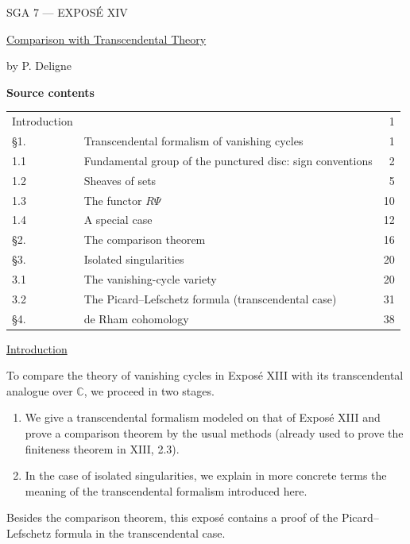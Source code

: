 \clearpage
\begin{center}
{\large SGA 7 --- EXPOS\'E XIV}\par
\vspace{2em}
{\Large\underline{Comparison with Transcendental Theory}}\par
\vspace{1.5em}
{\large by P. Deligne}
\end{center}

\medskip
\noindent\textbf{Source contents}
\begin{center}
\begin{tabular}{@{}llr@{}}
Introduction && 1\\
\S1. & Transcendental formalism of vanishing cycles & 1\\
1.1 & Fundamental group of the punctured disc: sign conventions & 2\\
1.2 & Sheaves of sets & 5\\
1.3 & The functor $R\Psi$ & 10\\
1.4 & A special case & 12\\
\S2. & The comparison theorem & 16\\
\S3. & Isolated singularities & 20\\
3.1 & The vanishing-cycle variety & 20\\
3.2 & The Picard--Lefschetz formula (transcendental case) & 31\\
\S4. & de Rham cohomology & 38
\end{tabular}
\end{center}

\medskip
\underline{Introduction}

To compare the theory of vanishing cycles in Expos\'e XIII with its
transcendental analogue over $\mathbb C$, we proceed in two stages.

\begin{enumerate}[label=(\alph*),leftmargin=2.6em]
\item We give a transcendental formalism modeled on that of
Expos\'e XIII and prove a comparison theorem by the usual methods
(already used to prove the finiteness theorem in XIII, 2.3).

\item In the case of isolated singularities, we explain in more
concrete terms the meaning of the transcendental formalism introduced
here.
\end{enumerate}

Besides the comparison theorem, this expos\'e contains a proof of the
Picard--Lefschetz formula in the transcendental case.

